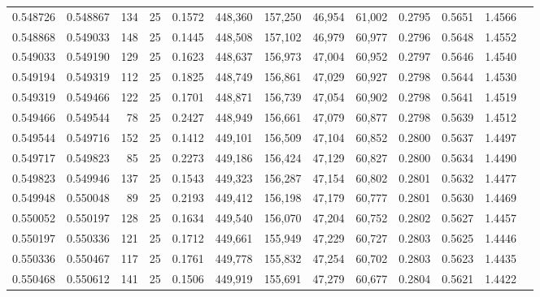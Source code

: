 \begin{tabular}{rrrrrrrrrrrrr}
0.548726 & 0.548867 &   134 &  25 &                                     0.1572 & 448,360 & 157,250 &  46,954 &  61,002 & 0.2795 & 0.5651 & 1.4566 \\
0.548868 & 0.549033 &   148 &  25 &                                     0.1445 & 448,508 & 157,102 &  46,979 &  60,977 & 0.2796 & 0.5648 & 1.4552 \\
0.549033 & 0.549190 &   129 &  25 &                                     0.1623 & 448,637 & 156,973 &  47,004 &  60,952 & 0.2797 & 0.5646 & 1.4540 \\
0.549194 & 0.549319 &   112 &  25 &                                     0.1825 & 448,749 & 156,861 &  47,029 &  60,927 & 0.2798 & 0.5644 & 1.4530 \\
0.549319 & 0.549466 &   122 &  25 &                                     0.1701 & 448,871 & 156,739 &  47,054 &  60,902 & 0.2798 & 0.5641 & 1.4519 \\
0.549466 & 0.549544 &    78 &  25 &                                     0.2427 & 448,949 & 156,661 &  47,079 &  60,877 & 0.2798 & 0.5639 & 1.4512 \\
0.549544 & 0.549716 &   152 &  25 &                                     0.1412 & 449,101 & 156,509 &  47,104 &  60,852 & 0.2800 & 0.5637 & 1.4497 \\
0.549717 & 0.549823 &    85 &  25 &                                     0.2273 & 449,186 & 156,424 &  47,129 &  60,827 & 0.2800 & 0.5634 & 1.4490 \\
0.549823 & 0.549946 &   137 &  25 &                                     0.1543 & 449,323 & 156,287 &  47,154 &  60,802 & 0.2801 & 0.5632 & 1.4477 \\
0.549948 & 0.550048 &    89 &  25 &                                     0.2193 & 449,412 & 156,198 &  47,179 &  60,777 & 0.2801 & 0.5630 & 1.4469 \\
0.550052 & 0.550197 &   128 &  25 &                                     0.1634 & 449,540 & 156,070 &  47,204 &  60,752 & 0.2802 & 0.5627 & 1.4457 \\
0.550197 & 0.550336 &   121 &  25 &                                     0.1712 & 449,661 & 155,949 &  47,229 &  60,727 & 0.2803 & 0.5625 & 1.4446 \\
0.550336 & 0.550467 &   117 &  25 &                                     0.1761 & 449,778 & 155,832 &  47,254 &  60,702 & 0.2803 & 0.5623 & 1.4435 \\
0.550468 & 0.550612 &   141 &  25 &                                     0.1506 & 449,919 & 155,691 &  47,279 &  60,677 & 0.2804 & 0.5621 & 1.4422 \\

\end{tabular}
